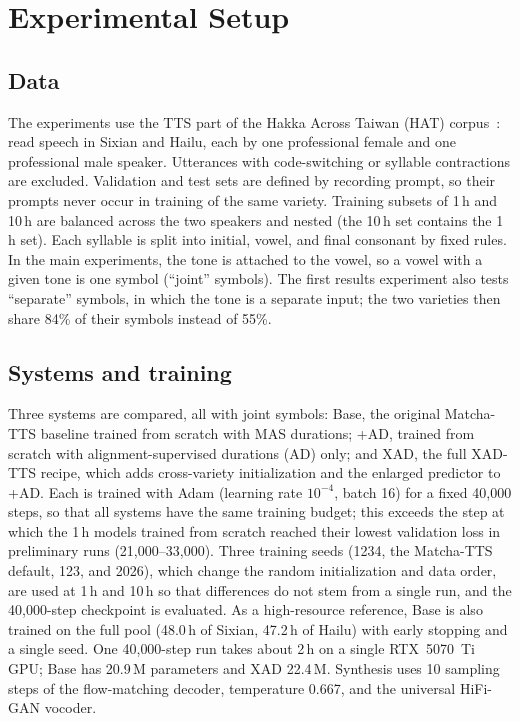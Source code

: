 \documentclass[conference,a4paper]{IEEEtran}
\begin{document}
\section{Experimental Setup}

\subsection{Data}
The experiments use the TTS part of the Hakka Across Taiwan (HAT) corpus~\cite{hat2024}: read speech in Sixian and Hailu, each by one professional female and one professional male speaker. Utterances with code-switching or syllable contractions are excluded. Validation and test sets are defined by recording prompt, so their prompts never occur in training of the same variety. Training subsets of 1\,h and 10\,h are balanced across the two speakers and nested (the 10\,h set contains the 1\,h set). Each syllable is split into initial, vowel, and final consonant by fixed rules. In the main experiments, the tone is attached to the vowel, so a vowel with a given tone is one symbol (``joint'' symbols). The first results experiment also tests ``separate'' symbols, in which the tone is a separate input; the two varieties then share 84\% of their symbols instead of 55\%.

\subsection{Systems and training}
Three systems are compared, all with joint symbols: Base, the original Matcha-TTS baseline trained from scratch with MAS durations; +AD, trained from scratch with alignment-supervised durations (AD) only; and XAD, the full XAD-TTS recipe, which adds cross-variety initialization and the enlarged predictor to +AD. Each is trained with Adam (learning rate $10^{-4}$, batch 16) for a fixed 40{,}000 steps, so that all systems have the same training budget; this exceeds the step at which the 1\,h models trained from scratch reached their lowest validation loss in preliminary runs (21{,}000--33{,}000). Three training seeds (1234, the Matcha-TTS default, 123, and 2026), which change the random initialization and data order, are used at 1\,h and 10\,h so that differences do not stem from a single run, and the 40{,}000-step checkpoint is evaluated. As a high-resource reference, Base is also trained on the full pool (48.0\,h of Sixian, 47.2\,h of Hailu) with early stopping and a single seed. One 40{,}000-step run takes about 2\,h on a single RTX~5070~Ti GPU; Base has 20.9\,M parameters and XAD 22.4\,M.
Synthesis uses 10 sampling steps of the flow-matching decoder, temperature 0.667, and the universal HiFi-GAN vocoder.
\end{document}

